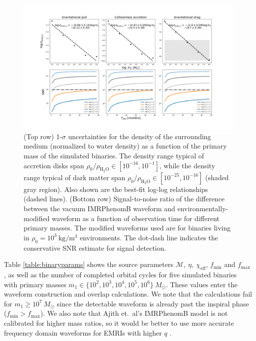 \documentclass[10pt,a4paper,twoside]{article}
\begin{document}
\begin{figure}[tb]
\centering
\includegraphics[width=\linewidth]{SPP2021_mainresults.png}
\caption{(Top row) 1-$\sigma$ uncertainties for the density of the surrounding medium (normalized to water density) as a function of the primary mass of the simulated binaries. The density range typical of accretion disks span $\rho_0/\rho_{\text{H}_2\text{O}} \in [10^{-16}, 10^{-1}]$, while the density range typical of dark matter span $\rho_0/\rho_{\text{H}_2\text{O}} \in [10^{-25}, 10^{-16}]$ (shaded gray region). Also shown are the best-fit log-log relationships (dashed lines). (Bottom row) Signal-to-noise ratio of the difference between the vacuum IMRPhenomB waveform and environmentally-modified waveform as a function of observation time for different primary masses. The modified waveforms used are for binaries living in $\rho_0 = 10^{3} ~\text{kg}/\text{m}^3$ environments. The dot-dash line indicates the conservative SNR estimate for signal detection.}
\label{fig:results}
\end{figure}

Table \ref{table:binaryparams} shows the source parameters $\mathcal{M}, ~\eta, ~\chi_{\text{eff}}$, $f_{\text{min}}$ and $f_{\text{max}}$, as well as the number of completed orbital cycles for five simulated binaries with primary masses $m_1 \in \{10^2, 10^3, 10^4, 10^5, 10^6\} ~M_{\odot}$. These values enter the waveform construction and overlap calculations. We note that the calculations fail for $m_1 \geq 10^7 ~M_{\odot}$ since the detectable waveform is already past the inspiral phase ($f_{\text{min}} > f_{\text{max}}$). We also note that Ajith et.~al's IMRPhenomB model is not calibrated for higher mass ratios, so it would be better to use more accurate frequency domain waveforms for EMRIs with higher $q$ \cite{Isoyama2020}. 
\end{document}
